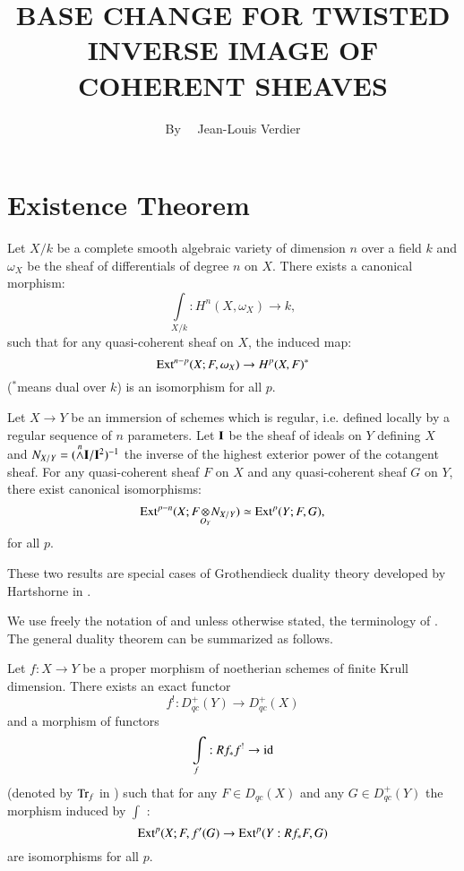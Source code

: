 \title{BASE CHANGE FOR TWISTED INVERSE IMAGE OF COHERENT SHEAVES}

\author{By~~ Jean-Louis Verdier}
\date{}

\maketitle

\setcounter{pageoriginal}{392}
\section{Existence Theorem}\label{art20-sec1}
\pageoriginale
Let $X/k$ be a complete smooth algebraic variety of dimension $n$ over a field $k$ and $\omega_{X}$ be the sheaf of differentials of degree $n$ on $X$. There exists a canonical morphism:
$$
\int\limits_{X/k}:H^{n}(X,\omega_{X})\to k,
$$
such that for any quasi-coherent sheaf on $X$, the induced map:
$$
\operatorname{\mathrm{Ext}}^{n-p}(X;F,\omega_{X})\to H^{p}(X,F)^{*}
$$
($^{*}$means dual over $k$) is an isomorphism for all $p$.

Let $X\to Y$ be an immersion of schemes which is regular, i.e. defined locally by a regular sequence of $n$ parameters. Let $\mathbf{I}$ be the sheaf of ideals on $Y$ defining $X$ and $N_{X/Y}=({\displaystyle{\mathop{\wedge}\limits^{n}}}\mathbf{I}/\mathbf{I}^{2})^{-1}$ the inverse of the highest exterior power of the cotangent sheaf. For any quasi-coherent sheaf $F$ on $X$ and any quasi-coherent sheaf $G$ on $Y$, there exist canonical isomorphisms:
$$
\Ext^{p-n}(X;\foprod{F}{N_{X/Y}}{O_{Y}})\simeq \Ext^{p}(Y;F,G),
$$
for all $p$.

These two results are special cases of Grothendieck duality theory developed by Hartshorne in \cite{art20-key1}.

We use freely the notation of \cite{art20-key1} and unless otherwise stated, the terminology of \cite{art20-key1}. The general duality theorem can be summarized as follows.

\begin{theorem}\label{art20-thm1}
Let $f:X\to Y$ be a proper morphism of noetherian schemes of finite Krull dimension. There exists an exact functor
$$
f^{!}:D^{+}_{qc}(Y)\to D^{+}_{qc}(X)
$$
and a morphism of functors
$$
\int\limits_{f}:Rf_{*}f^{!}\to \operatorname{\mathrm{id}}
$$\pageoriginale
(denoted by $\operatorname{\mathrm{Tr}}_{f}$ in \cite{art20-key1}) such that for any $F\in D_{qc}(X)$ and any $G\in D^{+}_{qc}(Y)$ the morphism induced by $\int$ :
$$
\operatorname{\mathrm{Ext}}^{p}(X;F,f'(G)\to \operatorname{\mathrm{Ext}}^{p}(Y:Rf_{*}F,G)
$$
are isomorphisms for all $p$.
\end{theorem}


